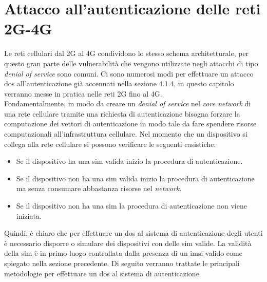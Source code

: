 \chapter{Attacco all'autenticazione delle reti 2G-4G}
Le reti cellulari dal 2G al 4G condividono lo stesso schema architetturale, per questo gran parte delle vulnerabilità che vengono
utilizzate negli attacchi di tipo \textit{denial of service} sono comuni.
Ci sono numerosi modi per effettuare un attacco \gls{dos} all'autenticazione già accennati nella sezione 4.1.4, in questo capitolo verranno messe in pratica 
nelle reti 2G fino al 4G.\\
Fondamentalmente, in modo da creare un \textit{denial of service} nel \textit{core network} di una rete cellulare tramite una richiesta di autenticazione bisogna forzare
la computazione dei vettori di autenticazione in modo tale da fare spendere risorse computazionali all'infrastruttura cellulare.
Nel momento che un dispositivo si collega alla rete cellulare si possono verificare le seguenti casistiche:
\begin{itemize}
    \item Se il dispositivo ha una \gls{sim} valida inizio la procedura di autenticazione.
    \item Se il dispositivo non ha una \gls{sim} valida inizio la procedura di autenticazione ma senza consumare abbastanza risorse nel \textit{network}.
    \item Se il dispositivo non ha una \gls{sim} la procedura di autenticazione non viene iniziata.
\end{itemize}
Quindi, è chiaro che per effettuare un \gls{dos} al sistema di autenticazione degli utenti è necessario disporre o simulare dei dispositivi con delle \gls{sim} valide. La validità della \gls{sim} è 
in primo luogo controllata dalla presenza di un \gls{imsi} valido come spiegato nella sezione precedente.
Di seguito verranno trattate le principali metodologie per effettuare un \gls{dos} al sistema di autenticazione.

\clearpage

